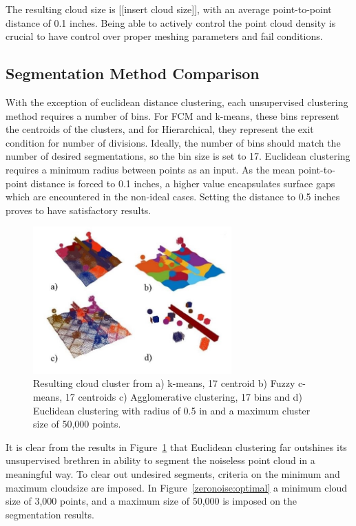 \documentclass[12pt]{drexelthesis}
\let\Oldsubsection\subsection
\renewcommand{\subsection}{\FloatBarrier\Oldsubsection}
\begin{document}
The resulting cloud size is [[insert cloud size]], with an average point-to-point distance of 0.1 inches. Being able to actively control the point cloud density is crucial to have control over proper meshing parameters and fail conditions.

\subsection{Segmentation Method Comparison}

With the exception of euclidean distance clustering, each unsupervised clustering method requires a number of bins. For FCM and k-means, these bins represent the centroids of the clusters, and for Hierarchical, they represent the exit condition for number of divisions. Ideally, the number of bins should match the number of desired segmentations, so the bin size is set to 17. Euclidean clustering requires a minimum radius between points as an input. As the mean point-to-point distance is forced to 0.1 inches, a higher value encapsulates surface gaps which are encountered in the non-ideal cases. Setting the distance to 0.5 inches proves to have satisfactory results.

\begin{figure}[!ht]
	\label{zeronoise:segcompare}
	\centering
		\includegraphics[width=3in]{simulated-lab-scan/0noise/all_methods.jpg}
		\caption[Comparison of unsupervised segmentation techniques on a simulated dataset.]{\centering Resulting cloud cluster from a) k-means, 17 centroid b) Fuzzy c-means, 17 centroids c) Agglomerative clustering, 17 bins and d) Euclidean clustering with radius of 0.5 in and a maximum cluster size of 50,000 points.}
	\label{zeronoise:compare}
\end{figure}

It is clear from the results in Figure~\ref{zeronoise:compare} that Euclidean clustering far outshines its unsupervised brethren in ability to segment the noiseless point cloud in a meaningful way. To clear out undesired segments, criteria on the minimum and maximum cloudsize are imposed. In Figure~\ref{zeronoise:optimal} a minimum cloud size of 3,000 points, and a maximum size of 50,000 is imposed on the segmentation results.
\end{document}
